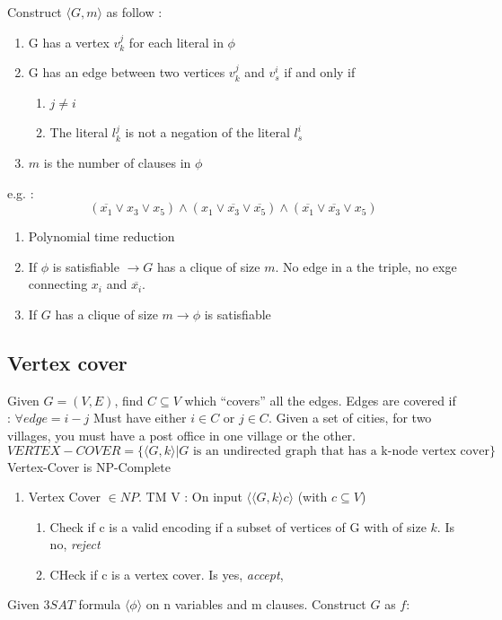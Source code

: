 \documentclass[12pt,a4paper]{article}
\newcommand{\<}{\langle}
\renewcommand{\>}{\rangle}
\begin{document}
Construct $\langle G, m\rangle$ as follow :
\begin{enumerate}
    \item G has a vertex $v_k^j$ for each literal in $\phi$
    \item G has an edge between two vertices $v_k^j$ and $v_s^i$ if and only if
            \begin{enumerate}[label=\alph*.]
                \item $j\neq i$
                \item The literal $l_k^j$ is not a negation of the literal $l_s^i$
            \end{enumerate}
    \item $m$ is the number of clauses in $\phi$
\end{enumerate}
e.g. : 
\[(\overline{x_1} \vee x_3 \vee x_5) \wedge (x_1 \vee \overline{x_3} \vee \overline{x_5}) \wedge (\overline{x_1} \vee \overline{x_3} \vee x_5)\]
\begin{enumerate}[label = STEP \Alph* :]
    \item Polynomial time reduction
    \item If $\phi$ is satisfiable $\to G$ has a clique of size $m$. No edge in a the triple, no exge connecting $x_i$ and $\overline{x_i}$.
    \item If $G$ has a clique of size $m \to \phi$ is satisfiable
\end{enumerate}

\subsection{Vertex cover}
Given $G = (V,E)$, find $C \subseteq V$ which ``covers'' all the edges. Edges are covered if : $\forall edge = i-j$ Must have either $i \in C$ or $j \in C$. Given a set of cities, for two villages, you must have a post office in one village or the other.
\[VERTEX-COVER = \{\langle G,k\rangle | G \text{ is an undirected graph that has a k-node vertex cover}\}\]
Vertex-Cover is NP-Complete
\begin{enumerate}[label=STEP \Alph*: ]
    \item Vertex Cover $\in NP$. TM V : On input $\langle\langle G,k\rangle c \rangle$ (with $c \subseteq V$)
    \begin{enumerate}
        \item Check if c is a valid encoding if a subset of vertices of G with of size $k$. Is no, \textit{reject}
        \item CHeck if c is a vertex cover. Is yes, \textit{accept}, 
    \end{enumerate}
\end{enumerate}

Given $3SAT$ formula $\langle \phi \rangle$ on n variables and m clauses. Construct $G$ as $f :$

\listoftodos
\end{document}
